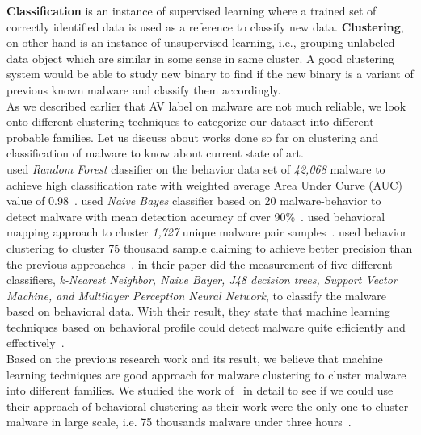 \textbf{Classification} is an instance of supervised learning where a trained set of correctly identified data is used as a reference to classify new data.
\textbf{Clustering}, on other hand is an instance of unsupervised learning, i.e., grouping unlabeled data object which are similar in some sense in same cluster.
A good clustering system would be able to study new binary to find if the new binary is a variant of previous known malware and classify them accordingly.\\
As we described earlier that AV label on malware are not much reliable, we look onto different clustering techniques to categorize our dataset into different probable families.
Let us discuss about works done so far on clustering and classification of malware to know about current state of art.\\
\textbf{\citeauthor{pirscoveanu}} used \emph{Random Forest} classifier on the behavior data set of \emph{42,068} malware to achieve high classification rate with weighted average Area Under Curve (AUC) value of 0.98~\cite[]{pirscoveanu}.
\textbf{\citeauthor{mosko}} used \emph{Naive Bayes} classifier based on 20 malware-behavior to detect malware with mean detection accuracy of over 90\%~\cite[]{mosko}.
\textbf{\citeauthor{yavvari}} used behavioral mapping approach to cluster \emph{1,727} unique malware pair samples~\cite[]{yavvari}.
\textbf{\citeauthor{bayer}} used behavior clustering to cluster 75 thousand sample claiming to achieve better precision than the previous approaches~\cite[]{bayer}.
\textbf{\citeauthor{firdausi}} in their paper did the measurement of five different classifiers, \emph{k-Nearest Neighbor, Naive Bayer, J48 decision trees, Support Vector Machine, and Multilayer Perception Neural Network}, to classify the malware based on behavioral data.
With their result, they state that machine learning techniques based on behavioral profile could detect malware quite efficiently and effectively~\cite[]{firdausi}.\\
Based on the previous research work and its result, we believe that machine learning techniques are good approach for malware clustering to cluster malware into different families.
We studied the work of~\citeauthor{bayer} in detail to see if we could use their approach of behavioral clustering as their work were the only one to cluster malware in large scale, i.e. 75 thousands malware under three hours~\cite[]{bayer}.
